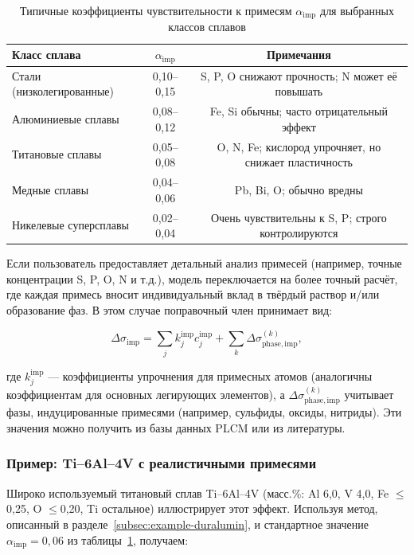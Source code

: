 \documentclass[12pt,a4paper]{article}
\begin{document}
	\begin{table}[htbp]
		\centering
		\caption{Типичные коэффициенты чувствительности к примесям \(\alpha_{\mathrm{imp}}\) для выбранных классов сплавов}
		\label{tab:impurity-coefficients}
		\begin{tabular}{lcc}
			\toprule
			\textbf{Класс сплава} & \(\alpha_{\mathrm{imp}}\) & \textbf{Примечания} \\
			\midrule
			Стали (низколегированные) & 0,10–0,15 & S, P, O снижают прочность; N может её повышать \\
			Алюминиевые сплавы & 0,08–0,12 & Fe, Si обычны; часто отрицательный эффект \\
			Титановые сплавы & 0,05–0,08 & O, N, Fe; кислород упрочняет, но снижает пластичность \\
			Медные сплавы & 0,04–0,06 & Pb, Bi, O; обычно вредны \\
			Никелевые суперсплавы & 0,02–0,04 & Очень чувствительны к S, P; строго контролируются \\
			\bottomrule
		\end{tabular}
	\end{table}
	
	Если пользователь предоставляет детальный анализ примесей (например, точные концентрации S, P, O, N и т.д.), модель переключается на более точный расчёт, где каждая примесь вносит индивидуальный вклад в твёрдый раствор и/или образование фаз. В этом случае поправочный член принимает вид:
	
	\[
	\Delta\sigma_{\mathrm{imp}} = \sum_{j} k_j^{\mathrm{imp}} c_j^{\mathrm{imp}} + \sum_{k} \Delta\sigma_{\mathrm{phase,imp}}^{(k)},
	\]
	
	где \(k_j^{\mathrm{imp}}\) — коэффициенты упрочнения для примесных атомов (аналогичны коэффициентам для основных легирующих элементов), а \(\Delta\sigma_{\mathrm{phase,imp}}^{(k)}\) учитывает фазы, индуцированные примесями (например, сульфиды, оксиды, нитриды). Эти значения можно получить из базы данных PLCM или из литературы.
	
	\subsubsection*{Пример: Ti--6Al--4V с реалистичными примесями}
	
	Широко используемый титановый сплав Ti--6Al--4V (масс.\%: Al 6,0, V 4,0, Fe \(\le\)0,25, O \(\le\)0,20, Ti остальное) иллюстрирует этот эффект. Используя метод, описанный в разделе~\ref{subsec:example-duralumin}, и стандартное значение \(\alpha_{\mathrm{imp}}=0,06\) из таблицы~\ref{tab:impurity-coefficients}, получаем:
	
\end{document}
